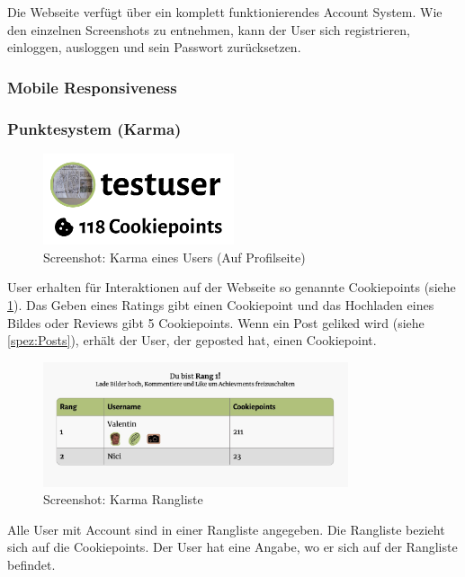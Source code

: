 Die Webseite verfügt über ein komplett funktionierendes Account System. Wie den
einzelnen Screenshots zu entnehmen, kann der User sich registrieren, einloggen,
ausloggen und sein Passwort zurücksetzen.

\subsubsection*{Mobile Responsiveness}

\subsubsection*{Punktesystem (Karma)}

\begin{figure}[ht]
    \centering
    \includegraphics[width=0.5\textwidth]{images/Resultat_Karma.png}
    \caption{Screenshot: Karma eines Users (Auf Profilseite)}
    \label{fig:r-karma}
\end{figure}

User erhalten für Interaktionen auf der Webseite so genannte Cookiepoints (siehe
\ref{fig:r-karma}). Das Geben eines Ratings gibt einen Cookiepoint und das
Hochladen eines Bildes oder Reviews gibt 5 Cookiepoints. Wenn ein Post geliked
wird (siehe \ref{spez:Posts}), erhält der User, der geposted hat, einen
Cookiepoint. 

\begin{figure}[ht]
    \centering
    \includegraphics[width=0.8\textwidth]{images/Resultat_Rangliste.png}
    \caption{Screenshot: Karma Rangliste}
    \label{fig:r-rangliste}
\end{figure} 

Alle User mit Account sind in einer Rangliste angegeben. Die Rangliste bezieht
sich auf die Cookiepoints. Der User hat eine Angabe, wo er sich auf der
Rangliste befindet.


